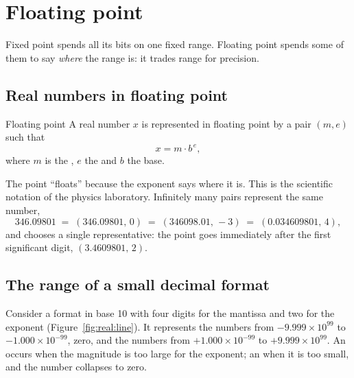 \section{Floating point}

Fixed point spends all its bits on one fixed range. Floating point spends
some of them to say \emph{where} the range is: it trades range for precision.

\subsection{Real numbers in floating point}

\begin{definition}{Floating point}
A real number $x$ is represented in floating point by a pair $(m,e)$ such that
\[ x = m\cdot b^{\,e}, \]
where $m$ is the , $e$ the  and $b$ the base.
\end{definition}

The point ``floats'' because the exponent says where it is. This is the
scientific notation of the physics laboratory. Infinitely many pairs
represent the same number,
\[
346.09801 \;=\; (346.09801,\,0) \;=\; (346098.01,\,-3) \;=\; (0.034609801,\,4),
\]
and  chooses a single representative: the point goes
immediately after the first significant digit, $(3.4609801,\,2)$.

\subsection{The range of a small decimal format}

Consider a format in base 10 with four digits for the mantissa and two for
the exponent (Figure~\ref{fig:real:line}). It represents the numbers from
$-9.999\times 10^{99}$ to $-1.000\times 10^{-99}$, zero, and the numbers from
$+1.000\times 10^{-99}$ to $+9.999\times 10^{99}$. An  occurs
when the magnitude is too large for the exponent; an  when it
is too small, and the number collapses to zero.

